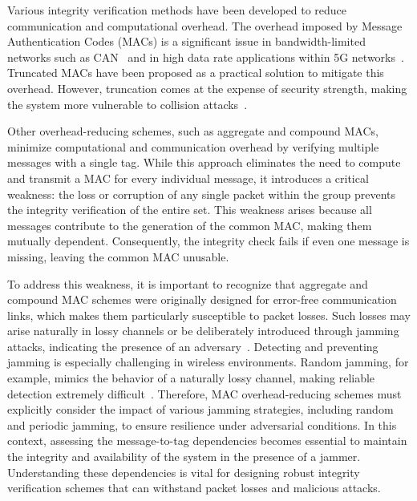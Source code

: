 

Various integrity verification methods have been developed to reduce communication and computational overhead. The overhead imposed by Message Authentication Codes (MACs) is a significant issue in bandwidth-limited networks such as CAN~\cite{compoundMAC} and in high data rate applications within 5G networks~\cite{etsi_ts_133501_v17_5_0}. Truncated MACs have been proposed as a practical solution to mitigate this overhead. However, truncation comes at the expense of security strength, making the system more vulnerable to collision attacks~\cite{ProMAC1}.

Other overhead-reducing schemes, such as aggregate and compound MACs, minimize computational and communication overhead by verifying multiple messages with a single tag. While this approach eliminates the need to compute and transmit a MAC for every individual message, it introduces a critical weakness: the loss or corruption of any single packet within the group prevents the integrity verification of the entire set. This weakness arises because all messages contribute to the generation of the common MAC, making them mutually dependent. Consequently, the integrity check fails if even one message is missing, leaving the common MAC unusable.

To address this weakness, it is important to recognize that aggregate and compound MAC schemes were originally designed for error-free communication links, which makes them particularly susceptible to packet losses. Such losses may arise naturally in lossy channels or be deliberately introduced through jamming attacks, indicating the presence of an adversary~\cite{jamming_Servey, XOR_MAC, proMac2, DoS_AggregateMAC}. Detecting and preventing jamming is especially challenging in wireless environments. Random jamming, for example, mimics the behavior of a naturally lossy channel, making reliable detection extremely difficult~\cite{jamming_Servey}. Therefore, MAC overhead-reducing schemes must explicitly consider the impact of various jamming strategies, including random and periodic jamming, to ensure resilience under adversarial conditions.
In this context, assessing the message-to-tag dependencies becomes essential to maintain the integrity and availability of the system in the presence of a jammer. Understanding these dependencies is vital for designing robust integrity verification schemes that can withstand packet losses and malicious attacks.



